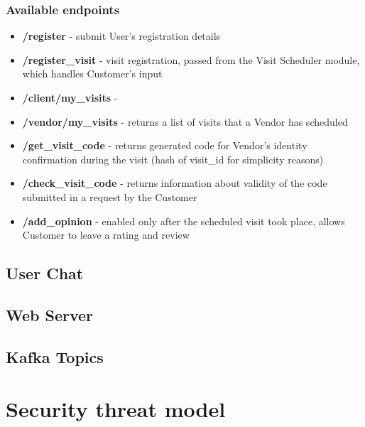 \documentclass[11pt,a4paper]{article}
\begin{document}
\subsubsection{Available endpoints}
\begin{itemize}
\item \textbf{\slash register} - submit User's registration details
\item \textbf{\slash register\_visit} - visit registration, passed from the Visit Scheduler module, which handles Customer's input
\item \textbf{\slash client/my\_visits} - 
\item \textbf{\slash vendor/my\_visits} - returns a list of visits that a Vendor has scheduled
\item \textbf{\slash get\_visit\_code} - returns generated code for Vendor's identity confirmation during the visit (hash of visit\_id for simplicity reasons)
\item \textbf{\slash check\_visit\_code} - returns information about validity of the code submitted in a request by the Customer
\item \textbf{\slash add\_opinion} - enabled only after the scheduled visit took place, allows Customer to leave a rating and review
\end{itemize}


\subsection{User Chat}

\subsection{Web Server}

\subsection{Kafka Topics}


\section{Security threat model}
\end{document}
